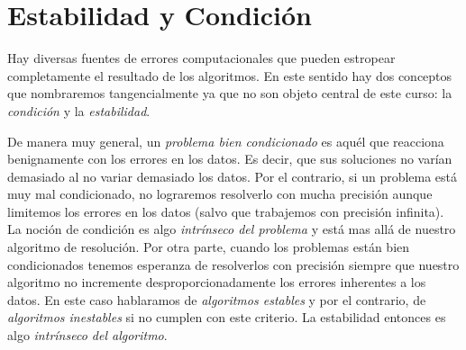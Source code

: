 \section{Estabilidad y Condición}
Hay diversas fuentes de errores computacionales que pueden estropear completamente el resultado de los algoritmos. En este sentido hay dos conceptos que nombraremos tangencialmente ya que no son objeto central de este curso: la \emph{condición} y la \emph{estabilidad}.

De manera muy general, un \emph{problema bien condicionado} es aquél que reacciona benignamente con los errores en los datos. Es decir, que sus soluciones no varían demasiado al no variar demasiado los datos. Por el contrario, si un problema está muy mal condicionado, no lograremos resolverlo con mucha precisión aunque limitemos los errores en los datos (salvo que trabajemos con precisión infinita). La noción de condición es algo \emph{intrínseco del problema} y está mas allá de nuestro algoritmo de resolución.  Por otra parte, cuando los problemas están bien condicionados tenemos esperanza de resolverlos con precisión siempre que nuestro algoritmo no incremente desproporcionadamente los errores inherentes a los datos. En este caso hablaramos de \emph{algoritmos estables} y por el contrario, de  \emph{algoritmos inestables} si no cumplen con este criterio. La estabilidad entonces es algo \emph{intrínseco del algoritmo}.




